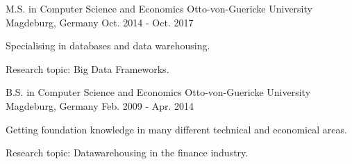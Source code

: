 

\begin{cventries}

     
   
   \cventry
    {M.S. in Computer Science and Economics} %
    {Otto-von-Guericke University} %
    {Magdeburg, Germany} %
    {Oct. 2014 - Oct. 2017} %
    {
      \begin{cvitems} %
          \item{Specialising in databases and data warehousing.}
          \item{Research topic: Big Data Frameworks.}
      \end{cvitems}
    }
    
   \cventry
    {B.S. in Computer Science and Economics} %
    {Otto-von-Guericke University} %
    {Magdeburg, Germany} %
    {Feb. 2009 - Apr. 2014} %
    {
      \begin{cvitems} %
          \item{Getting foundation knowledge in many different technical and economical areas.}
          \item{Research topic: Datawarehousing in the finance industry.}
      \end{cvitems}
    }
\end{cventries}
